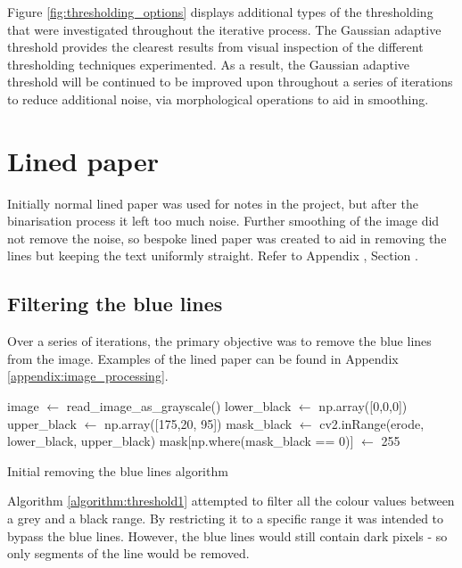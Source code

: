 Figure \ref{fig:thresholding_options} displays additional types of the thresholding that were investigated throughout the iterative process. The Gaussian adaptive threshold provides the clearest results from visual inspection of the different thresholding techniques experimented. As a result, the Gaussian adaptive threshold will be continued to be improved upon throughout a series of iterations to reduce additional noise, via morphological operations to aid in smoothing.

\section{Lined paper}
Initially normal lined paper was used for notes in the project, but after the binarisation process it left too much noise. Further smoothing of the image did not remove the noise, so bespoke lined paper was created to aid in removing the lines but keeping the text uniformly straight. Refer to Appendix \cite{appendix:image_processing}, Section \cite{processing:pre-line}.

\subsection{Filtering the blue lines}
Over a series of iterations, the primary objective was to remove the blue lines from the image. Examples of the lined paper can be found in Appendix \ref{appendix:image_processing}.

\begin{algorithm} [H]
\begin{algorithmic}[1]
    \State image $\gets$ read\_image\_as\_grayscale()
    \State lower\_black $\gets$ np.array([0,0,0])
    \State upper\_black $\gets$ np.array([175,20, 95])
    \State mask\_black $\gets$ cv2.inRange(erode, lower\_black, upper\_black)
    \State mask[np.where(mask\_black == 0)] $\gets$ 255
  \EndFunction
  \end{algorithmic}
  \caption{Initial removing the blue lines algorithm}
  \label{algorithm:threshold1}
\end{algorithm}

Algorithm \ref{algorithm:threshold1} attempted to filter all the colour values between a grey and a black range. By restricting it to a specific range it was intended to bypass the blue lines. However, the blue lines would still contain dark pixels - so only segments of the line would be removed.


